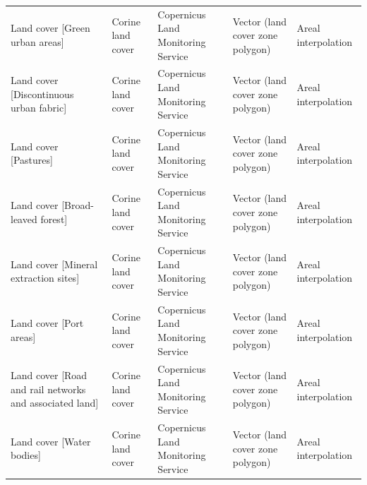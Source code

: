 \documentclass[fleqn,10pt]{wlscirep}
\begin{document}
\begin{longtable}{p{}p{}p{}p{}p{}}
                                                                            Land cover [Green urban areas] &                  Corine land cover  &                                         Copernicus Land Monitoring Service  &  Vector (land cover zone polygon)  &                            Areal interpolation  \\
                                                                Land cover [Discontinuous urban fabric] &                  Corine land cover  &                                         Copernicus Land Monitoring Service  &  Vector (land cover zone polygon)  &                            Areal interpolation  \\
                                                                                    Land cover [Pastures] &                  Corine land cover  &                                         Copernicus Land Monitoring Service  &  Vector (land cover zone polygon)  &                            Areal interpolation  \\
                                                                        Land cover [Broad-leaved forest] &                  Corine land cover  &                                         Copernicus Land Monitoring Service  &  Vector (land cover zone polygon)  &                            Areal interpolation  \\
                                                                    Land cover [Mineral extraction sites] &                  Corine land cover  &                                         Copernicus Land Monitoring Service  &  Vector (land cover zone polygon)  &                            Areal interpolation  \\
                                                                                Land cover [Port areas] &                  Corine land cover  &                                         Copernicus Land Monitoring Service  &  Vector (land cover zone polygon)  &                            Areal interpolation  \\
                                                Land cover [Road and rail networks and associated land] &                  Corine land cover  &                                         Copernicus Land Monitoring Service  &  Vector (land cover zone polygon)  &                            Areal interpolation  \\
                                                                                Land cover [Water bodies] &                  Corine land cover  &                                         Copernicus Land Monitoring Service  &  Vector (land cover zone polygon)  &                            Areal interpolation  \\

\end{longtable}
\end{document}
